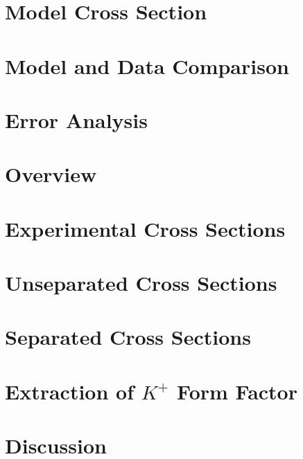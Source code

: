 \documentclass[
]{report}
\begin{document}
\hypertarget{Section-7.3}{%
\section{Model Cross Section}\label{Section-7.3}}

\hypertarget{Section-7.4}{%
\section{Model and Data Comparison}\label{Section-7.4}}

\hypertarget{Section-7.5}{%
\section{Error Analysis}\label{Section-7.5}}

\label{Chapter-8}

\hypertarget{Section-8.1}{%
\section{Overview}\label{Section-8.1}}

\hypertarget{Section-8.2}{%
\section{Experimental Cross Sections}\label{Section-8.2}}

\hypertarget{Section-8.3}{%
\section{Unseparated Cross Sections}\label{Section-8.3}}

\hypertarget{Section-8.4}{%
\section{Separated Cross Sections}\label{Section-8.4}}

\hypertarget{Section-8.5}{%
\section{\texorpdfstring{Extraction of \(K^{+}\) Form
Factor}{Extraction of K\^{}\{+\} Form Factor}}\label{Section-8.5}}

\hypertarget{Section-8.6}{%
\section{Discussion}\label{Section-8.6}}
\end{document}
